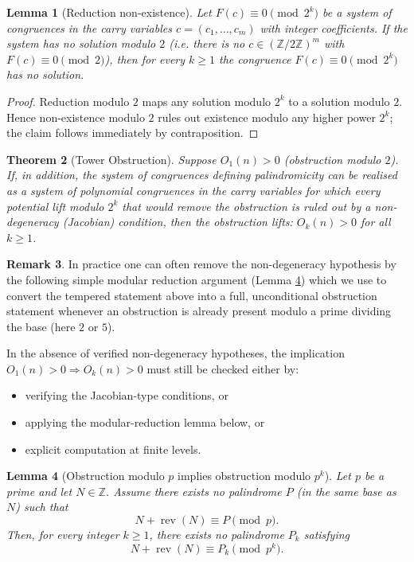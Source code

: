 \documentclass[11pt,a4paper]{article}
\theoremstyle{plain}
\newtheorem{theorem}{Theorem}[section]
\newtheorem{lemma}[theorem]{Lemma}
\theoremstyle{definition}
\newtheorem{remark}[theorem]{Remark}
\begin{document}
\begin{lemma}[Reduction non-existence]\label{lem:reduction_nonexist}
Let $F(c)\equiv 0\pmod{2^k}$ be a system of congruences in the carry variables $c=(c_1,\dots,c_m)$ with integer coefficients. If the system has no solution modulo $2$ (i.e. there is no $c\in(\mathbb Z/2\mathbb Z)^m$ with $F(c)\equiv0\pmod 2$), then for every $k\ge1$ the congruence $F(c)\equiv0\pmod{2^k}$ has no solution.
\end{lemma}

\begin{proof}
Reduction modulo $2$ maps any solution modulo $2^k$ to a solution modulo $2$. Hence non-existence modulo $2$ rules out existence modulo any higher power $2^k$; the claim follows immediately by contraposition.
\end{proof}

\begin{theorem}[Tower Obstruction]\label{thm:tower_obstruction}
Suppose $O_1(n) > 0$ (obstruction modulo $2$). If, in addition, the system of congruences defining palindromicity can be realised as a system of polynomial congruences in the carry variables for which every potential lift modulo $2^k$ that would remove the obstruction is ruled out by a non-degeneracy (Jacobian) condition, then the obstruction lifts: $O_k(n) > 0$ for all $k\ge 1$.
\end{theorem}

\begin{remark}
In practice one can often remove the non-degeneracy hypothesis by the following simple modular reduction argument (Lemma \ref{lem:mod_p_lift}) which we use to convert the tempered statement above into a full, unconditional obstruction statement whenever an obstruction is already present modulo a prime dividing the base (here $2$ or $5$).

In the absence of verified non-degeneracy hypotheses, the implication $O_1(n)>0 \Rightarrow O_k(n)>0$ must still be checked either by:
\begin{itemize}
\item verifying the Jacobian-type conditions, or
\item applying the modular-reduction lemma below, or
\item explicit computation at finite levels.
\end{itemize}
\end{remark}

\begin{lemma}[Obstruction modulo $p$ implies obstruction modulo $p^k$]\label{lem:mod_p_lift}
Let $p$ be a prime and let $N\in\mathbb{Z}$.  
Assume there exists no palindrome $P$ (in the same base as $N$) such that
\[
N + \operatorname{rev}(N) \equiv P \pmod p.
\]
Then, for every integer $k \ge 1$, there exists no palindrome $P_k$ satisfying
\[
N + \operatorname{rev}(N) \equiv P_k \pmod{p^k}.
\]
\end{lemma}
\end{document}
